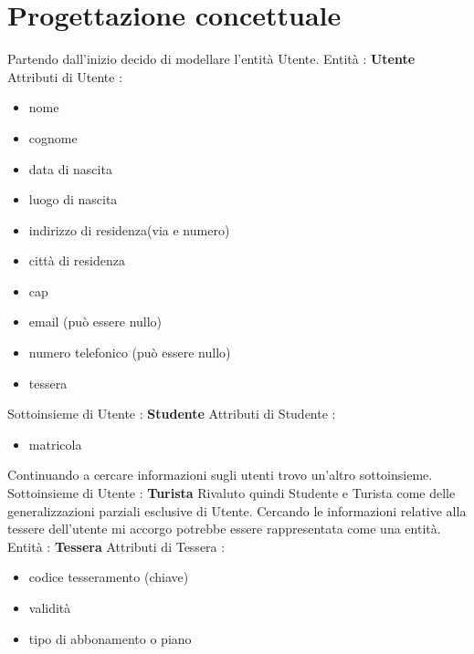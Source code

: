 \documentclass[a4paper,twoside]{article}
\begin{document}
\section{Progettazione concettuale}
%
%
%
Partendo dall'inizio decido di modellare l'entità Utente.\newline
Entità : \textbf{Utente}\newline
Attributi di Utente :
\begin{itemize}
 \item nome
 \item cognome
 \item data di nascita
 \item luogo di nascita
 \item indirizzo di residenza(via e numero)
 \item città di residenza
 \item cap
 \item email (può essere nullo)
 \item numero telefonico (può essere nullo)
 \item tessera
\end{itemize}
Sottoinsieme di Utente : \textbf{Studente}\newline
Attributi di Studente :
\begin{itemize}
 \item matricola
\end{itemize}
Continuando a cercare informazioni sugli utenti trovo un'altro sottoinsieme.\newline
Sottoinsieme di Utente : \textbf{Turista}\newline
Rivaluto quindi Studente e Turista come delle generalizzazioni parziali esclusive di Utente.\newline
Cercando le informazioni relative alla tessere dell'utente mi accorgo potrebbe essere rappresentata come una entità.\newline
Entità : \textbf{Tessera}\newline
Attributi di Tessera :
\begin{itemize}
 \item codice tesseramento (chiave)
 \item validità
 \item tipo di abbonamento o piano
\end{itemize}
\end{document}
